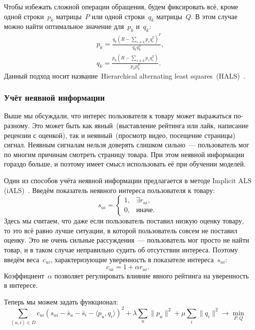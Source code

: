 \documentclass[12pt,fleqn]{article}
\begin{document}
Чтобы избежать сложной операции обращения, будем фиксировать всё, кроме одной строки~$p_k$ матрицы~$P$
или одной строки~$q_k$ матрицы~$Q$.
В этом случае можно найти оптимальное значение для~$p_k$ и~$q_k$:
\begin{align*}
    &p_k
    =
    \frac{q_k (R - \sum_{s \neq k} p_s q_s^T)^T}{q_k q_k^T},\\
    &q_k
    =
    \frac{p_k (R - \sum_{s \neq k} p_s q_s^T)}{p_k p_k^T}.
\end{align*}
Данный подход носит название~Hierarchical alternating least squares~(HALS)~\cite{gillis12hals}.

\subsubsection{Учёт неявной информации}
Выше мы обсуждали, что интерес пользователя к товару может выражаться по-разному.
Это может быть как явный~(выставление рейтинга или лайк, написание рецензии с оценкой),
так и неявный~(просмотр видео, посещение страницы) сигнал.
Неявным сигналам нельзя доверять слишком сильно~--- пользователь мог по многим причинам смотреть
страницу товара.
При этом неявной информации гораздо больше, и поэтому имеет смысл использовать её при обучении моделей.

Один из способов учёта неявной информации предлагается в методе Implicit ALS (iALS)~\cite{hu08ials}.
Введём показатель неявного интереса пользователя к товару:
\[
    s_{ui}
    =
    \begin{cases}
        1, & \exists r_{ui},\\
        0, & \text{иначе}.
    \end{cases}
\]
Здесь мы считаем, что даже если пользователь поставил низкую оценку товару,
то это всё равно лучше ситуации, в которой пользователь совсем не поставил оценку.
Это не очень сильные рассуждения~--- пользователь мог просто не найти
товар, и в таком случае неправильно судить об отсутствии интереса.
Поэтому введём веса~$c_{ui}$, характеризующие уверенность в показателе интереса~$s_{ui}$:
\[
    c_{ui}
    =
    1 + \alpha r_{ui}.
\]
Коэффициент~$\alpha$ позволяет регулировать влияние явного рейтинга на уверенность в интересе.

Теперь мы можем задать функционал:
\[
    \sum_{(u, i) \in D}
        c_{ui} \left(
            s_{ui}
            -
            \bar s_u
            -
            \bar s_i
            -
            \langle p_{u}, q_{i} \rangle
        \right)^{2}
    +
    \lambda
    \sum_{u}
        \|p_u\|^2
    +
    \mu
    \sum_{i}
        \|q_i\|^2
    \to
    \min_{P, Q}
\]
\end{document}
